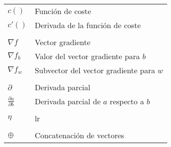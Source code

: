 \begin{tabular}{@{}ll@{}}
\\
$c()$ & Función de coste \\
$c'()$ & Derivada de la función de coste \\
\\
$\nabla f$ & Vector gradiente \\
$\nabla f_b$ & Valor del vector gradiente para $b$\\
$\nabla f_w$ & Subvector del vector gradiente para $w$\\
\\
$\partial$ & Derivada parcial\\
$\frac{\partial a}{\partial b}$ & Derivada parcial de $a$ respecto a $b$ \\
\\
$\eta$ & \acrlong{lr} \\
\\

$\oplus$ & Concatenación de vectores
\end{tabular}